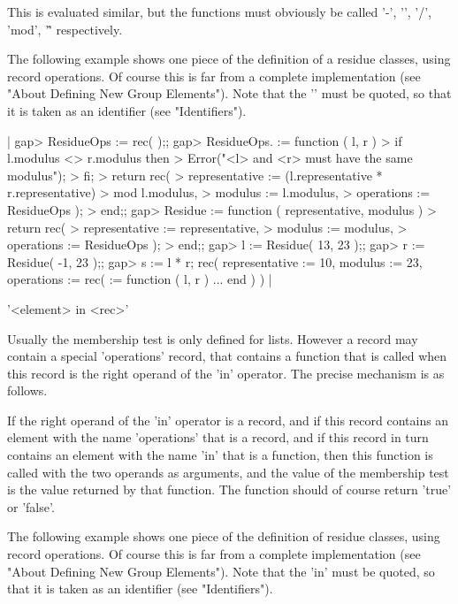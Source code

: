 This is  evaluated similar,  but the functions   must obviously be called
'-', '\*', '/', 'mod', '\^' respectively.

The following example shows  one piece of  the  definition of  a  residue
classes, using record operations.  Of course this is far  from a complete
implementation (see "About Defining New Group  Elements").  Note that the
'\*' must  be  quoted,  so  that   it   is taken  as an   identifier (see
"Identifiers").

|    gap> ResidueOps := rec( );;
    gap> ResidueOps.\* := function ( l, r )
    >   if l.modulus <> r.modulus  then
    >     Error("<l> and <r> must have the same modulus");
    >   fi;
    >   return rec(
    >     representative := (l.representative * r.representative)
    >                       mod l.modulus,
    >     modulus        := l.modulus,
    >     operations     := ResidueOps );
    > end;;
    gap> Residue := function ( representative, modulus )
    >   return rec(
    >     representative := representative,
    >     modulus        := modulus,
    >     operations     := ResidueOps );
    > end;;
    gap> l := Residue( 13, 23 );;
    gap> r := Residue( -1, 23 );;
    gap> s := l * r;
    rec(
      representative := 10,
      modulus := 23,
      operations := rec(
          \* := function ( l, r ) ... end ) ) |

%

'<element> in <rec>'

Usually the membership test is only defined  for lists.  However a record
may contain a special 'operations' record, that  contains a function that
is called  when this record  is the right  operand  of the 'in' operator.
The precise mechanism is as follows.

If the right operand of the 'in' operator is a record, and if this record
contains an element  with the name 'operations'  that is a record, and if
this record in turn contains  an  element with the  name  'in' that is  a
function, then  this   function  is  called with    the two  operands  as
arguments, and the value of the membership test  is the value returned by
that function.  The function should of course return 'true' or 'false'.

The following   example shows one  piece  of the definition  of   residue
classes, using record operations.  Of course this is  far from a complete
implementation (see "About Defining New Group Elements").  Note  that the
'in'   must  be  quoted, so that  it  is  taken as   an  identifier  (see
"Identifiers").

